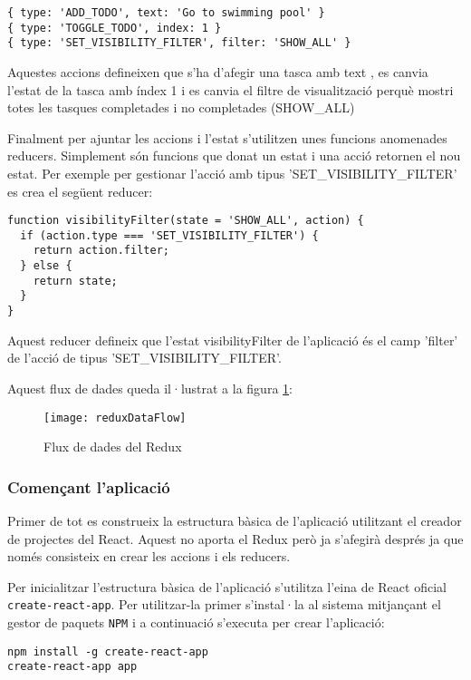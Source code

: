 \documentclass[12pt, titlepage]{article}
\begin{document}
\begin{lstlisting}[breaklines]
{ type: 'ADD_TODO', text: 'Go to swimming pool' }
{ type: 'TOGGLE_TODO', index: 1 }
{ type: 'SET_VISIBILITY_FILTER', filter: 'SHOW_ALL' }
\end{lstlisting}

Aquestes accions defineixen que s'ha d'afegir una tasca amb text 
, es canvia l'estat de la tasca amb índex 1 i es canvia el filtre de visualització
perquè mostri totes les tasques completades i no completades (SHOW\_ALL)

Finalment per ajuntar les accions i l'estat s'utilitzen unes funcions anomenades
reducers. Simplement són funcions que donat un estat i una acció retornen el nou
estat. Per exemple per gestionar l'acció amb tipus 'SET\_VISIBILITY\_FILTER' es
crea el següent reducer:

\begin{lstlisting}[breaklines]
function visibilityFilter(state = 'SHOW_ALL', action) {
  if (action.type === 'SET_VISIBILITY_FILTER') {
    return action.filter;
  } else {
    return state;
  }
}
\end{lstlisting}

Aquest reducer defineix que l'estat visibilityFilter de l'aplicació és el camp
'filter' de l'acció de tipus 'SET\_VISIBILITY\_FILTER'.

Aquest flux de dades queda il·lustrat a la figura \ref{reduxDataFlow}:

\begin{figure}[h]
\centering
\texttt{[image: reduxDataFlow]}
\caption{Flux de dades del Redux}
\label{reduxDataFlow}
\end{figure}

\subsubsection{Començant l'aplicació}

Primer de tot es construeix la estructura bàsica de l'aplicació utilitzant el
creador de projectes del React. Aquest no aporta el Redux però ja s'afegirà
després ja que només consisteix en crear les accions i els reducers.

Per inicialitzar l'estructura bàsica de l'aplicació s'utilitza l'eina de React
oficial \verb|create-react-app|. Per utilitzar-la primer s'instal·la al sistema
mitjançant el gestor de paquets \verb|NPM| i a continuació s'executa per crear
l'aplicació:

\begin{lstlisting}[breaklines]
npm install -g create-react-app
create-react-app app
\end{lstlisting}
\end{document}
